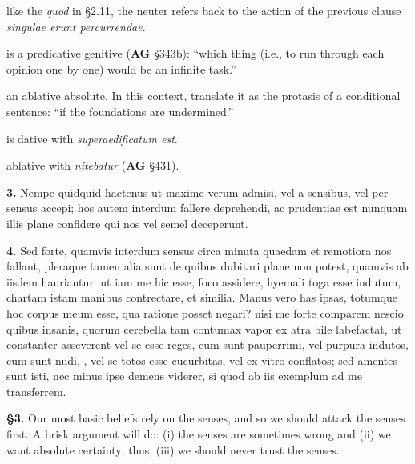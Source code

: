  like the \textit{quod} in §2.11, the neuter refers back to the action of the previous clause \textit{singulae erunt percurrendae}.

 is a predicative genitive (\textbf{AG} §343b): ``which thing (i.e., to run through each opinion one by one) would be an infinite task.''

 an ablative absolute. In this context, translate it as the protasis of a conditional sentence: ``if the foundations are undermined.''

 is dative with \textit{superaedificatum est}.

 ablative with \textit{nitebatur} (\textbf{AG} §431).


\clearpage

\beginnumbering
\pstart
\begin{latin}
    \textenglish{\textbf{3.}} Nempe quidquid hactenus ut maxime verum admisi, vel a sensibus, vel per sensus accepi; hos autem interdum fallere deprehendi, ac prudentiae est nunquam illis plane confidere qui nos vel semel deceperunt.
\end{latin}
\pend
\endnumbering

\beginnumbering
\pstart
\begin{latin}
    \textenglish{\textbf{4.}} Sed forte, quamvis interdum sensus circa minuta quaedam et remotiora nos fallant, pleraque tamen alia sunt de quibus dubitari plane non potest, quamvis ab iisdem hauriantur: ut iam me hic esse, foco assidere, hyemali toga esse indutum, chartam istam manibus contrectare, et similia. Manus vero has ipsas, totumque hoc corpus meum esse, qua ratione posset negari? nisi me forte comparem nescio quibus insanis, quorum cerebella tam contumax vapor ex atra bile labefactat, ut constanter asseverent vel se esse reges, cum sunt pauperrimi, vel purpura indutos, cum sunt nudi, , vel se totos esse cucurbitas, vel ex vitro conflatos; sed amentes sunt isti, nec minus ipse demens viderer, si quod ab iis exemplum ad me transferrem.
\end{latin}
\pend
\endnumbering

\prenotes

\textbf{§3.} Our most basic beliefs rely on the senses, and so we should attack the senses first. A brisk argument will do: (i) the senses are sometimes wrong and (ii) we want absolute certainty; thus, (iii) we should never trust the senses.

